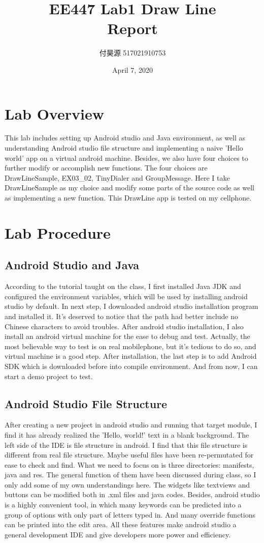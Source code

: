 \documentclass{article}
\title{\textbf{EE447 Lab1 Draw Line \\ Report}}
\author{付昊源 517021910753}
\date{April 7, 2020}
\begin{document}
\maketitle

\section{Lab Overview}
This lab includes setting up Android studio and Java environment, as well as understanding Android studio file structure and implementing a naive 'Hello world' app on a virtual android machine. Besides, we also have four choices to further modify or accomplish new functions. The four choices are DrawLineSample, EX03\_02, TinyDialer and GroupMessage. Here I take DrawLineSample as my choice and modify some parts of the source code as well as implementing a new function. This DrawLine app is tested on my cellphone.

\section{Lab Procedure}
\subsection{Android Studio and Java}
According to the tutorial taught on the class, I first installed Java JDK and configured the environment variables, which will be used by installing android studio by default. In next step, I downloaded android studio installation program and installed it. It's deserved to notice that the path had better include no Chinese characters to avoid troubles. After android studio installation, I also install an android virtual machine for the ease to debug and test. Actually, the most believable way to test is on real mobilephone, but it's tedious to do so, and virtual machine is a good step. After installation, the last step is to add Android SDK which is downloaded before into compile environment. And from now, I can start a demo project to test.

\subsection{Android Studio File Structure}
After creating a new project in android studio and running that target module, I find it has already realized the 'Hello, world!' text in a blank background. The left side of the IDE is file structure in android. I find that this file structure is different from real file structure. Maybe useful files have been re-permutated for ease to check and find. What we need to focus on is three directories: manifests, java and res. The general function of them have been discussed during class, so I only add some of my own understandings here. The widgets like textviews and buttons can be modified both in .xml files and java codes. Besides, android studio is a highly convenient tool, in which many keywords can be predicted into a group of options with only part of letters typed in. And many override functions can be printed into the edit area. All these features make android studio a general development IDE and give developers more power and efficiency.
\end{document}
